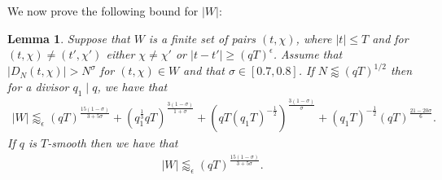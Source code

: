 \documentclass[12pt]{amsart}
\newtheorem{lemma}[theorem]{Lemma}
\theoremstyle{definition}
\theoremstyle{plain}
\theoremstyle{remark}
\numberwithin{equation}{section}
\numberwithin{theorem}{section}
\numberwithin{equation}{section}
\begin{document}
	We now prove the following bound for $|W|$:
	\begin{lemma}\label{p subdiv large values estimate}
		Suppose that $W$ is a finite set of pairs $(t, \chi)$,  where $|t| \leq T$ and for $(t, \chi)\neq (t', \chi')$ either $\chi \neq \chi'$ or $|t-t'|\geq (qT)^{\epsilon}$. Assume that $|D_N(t,\chi)|>N^{\sigma}$ for $(t,\chi)\in W$ and that $\sigma \in [0.7,0.8]$. If $N \lessapprox (qT)^{1/2}$ then for a divisor $q_1 \mid q$, we have that
		\begin{align*}
			|W| \lessapprox_{\epsilon} (qT)^{\frac{15(1-\sigma)}{3+5\sigma}}+(q_1^{\frac{1}{3}}qT)^{\frac{3(1-\sigma)}{1+\sigma}}+(qT(q_1T)^{-\frac{1}{2}})^{\frac{3(1-\sigma)}{\sigma}}+(q_1T)^{-\frac{1}{2}}(qT)^{\frac{21-20\sigma}{6}}. \label{Partial ZDE bound}
		\end{align*}
		If $q$ is $T$-smooth then we have that
		\begin{align*}
			|W| \lessapprox_{\epsilon} (qT)^{\frac{15(1-\sigma)}{3+5\sigma}}.
		\end{align*}
	\end{lemma}
\end{document}
